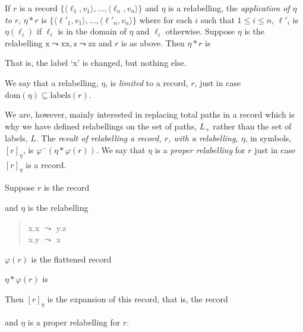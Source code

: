 If $r$ is a record
$\{\langle\ell_1,v_1\rangle,\ldots,\langle\ell_n,v_n\rangle\}$ and
$\eta$ is a relabelling, the \textit{application of $\eta$ to $r$},
$\eta*r$ is
$\{\langle\ell'_1,v_1\rangle,\ldots,\langle\ell'_n,v_n\rangle\}$ where
for each $i$ such that $1\leq i\leq n$, $\ell'_i$ is $\eta(\ell_i)$ if
$\ell_i$ is in the domain of $\eta$ and $\ell_i$ otherwise.  Suppose
$\eta$ is the relabelling $\mathrm{x}\leadsto\mathrm{xx},
\mathrm{z}\leadsto\mathrm{zz}$ and $r$ is as above.  Then $\eta*r$ is
\begin{quote}
\end{quote}
That is, the label `x' is changed, but nothing else.

We say that a relabelling, $\eta$, is \textit{limited} to a record,
$r$, just in case $\mathrm{dom}(\eta)\subseteq\mathrm{labels}(r)$.\label{pg:limited}

We are, however, mainly interested in replacing total paths in a
record which is why we have defined relabellings on the set of paths,
$L_+$ rather than the set of labels, $L$.  The \textit{result of
  relabelling a record, $r$, with a relabelling, $\eta$}, in symbols,
$[r]_\eta$, is $\varphi^-(\eta*\varphi(r))$.  We say that $\eta$ is a
\textit{proper relabelling}\label{pg:proper-relabelling} for $r$ just in case $[r]_\eta$ is a
record.

Suppose $r$ is the record
\begin{quote}
\end{quote}
and $\eta$ is the relabelling
\begin{quote}
x.x $\leadsto$ y.z\\
x.y $\leadsto$ x\\
\end{quote}
$\varphi(r)$ is the flattened record
\begin{quote}
\end{quote}
$\eta*\varphi(r)$ is
\begin{quote}
\end{quote}
Then $[r]_\eta$ is the expansion of this record, that is, the record
\begin{quote}
\end{quote}
and $\eta$ is a proper relabelling for $r$.  

